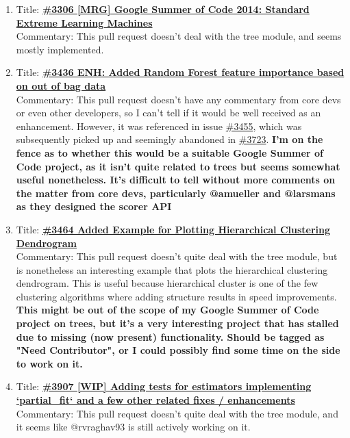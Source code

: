\documentclass[12pt, oneside]{article}
\begin{document}
\begin{enumerate}
  \item 
  Title:
  \textbf{\href{https://github.com/scikit-learn/scikit-learn/pull/3306}
    {\#3306 [MRG] Google Summer of Code 2014: Standard Extreme Learning Machines}}\\
  Commentary: This pull request doesn't deal with the tree module, and
  seems mostly implemented.

  \item 
  Title:
  \textbf{\href{https://github.com/scikit-learn/scikit-learn/pull/3436}
    {\#3436 ENH: Added Random Forest feature importance based on out
      of bag data}}\\
  Commentary: This pull request doesn't have any commentary from core
  devs or even other developers, so I can't tell if it would be well
  received as an enhancement. However, it was referenced in issue
  \href{https://github.com/scikit-learn/scikit-learn/issues/3455}{\#3455},
  which was subsequently picked up and seemingly abandoned in
  \href{https://github.com/scikit-learn/scikit-learn/pull/3723}{\#3723}. \textbf{I'm
  on the fence as to whether this would be a suitable Google Summer of Code project, as
  it isn't quite related to trees but seems somewhat useful
  nonetheless. It's difficult to tell without more comments on the
  matter from core devs, particularly @amueller and @larsmans as they
  designed the scorer API}

  \item 
  Title:
  \textbf{\href{https://github.com/scikit-learn/scikit-learn/pull/3464}
    {\#3464 Added Example for Plotting Hierarchical Clustering Dendrogram}}\\
  Commentary: This pull request doesn't quite deal with the tree
  module, but is nonetheless an interesting example that plots the
  hierarchical clustering dendrogram. This is useful because
  hierarchical cluster is one of the few clustering algorithms where
  adding structure results in speed improvements. \textbf{This might
    be out of the scope of my Google Summer of Code project on trees, but it's a very
    interesting project that has stalled due to missing (now present)
    functionality. Should be tagged as "Need Contributor", or I could
    possibly find some time on the side to work on it.}


  \item 
  Title:
  \textbf{\href{https://github.com/scikit-learn/scikit-learn/pull/3907}
    {\#3907 [WIP] Adding tests for estimators implementing
      `partial\_fit` and a few other related fixes / enhancements}}\\
  Commentary: This pull request doesn't quite deal with the tree
  module, and it seems like @rvraghav93 is still actively working on
  it.



\end{enumerate}
\end{document}
